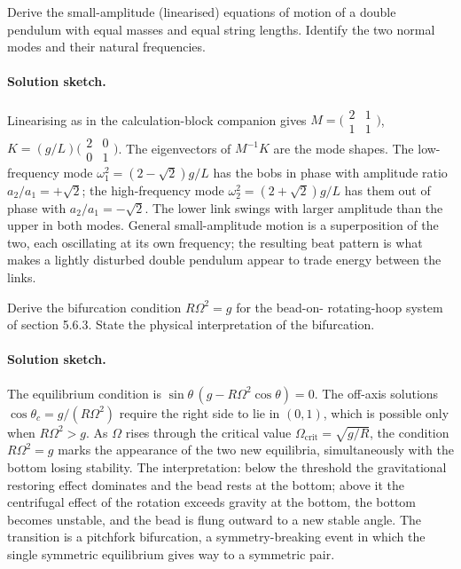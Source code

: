 \begin{exercise}
Derive the small-amplitude (linearised) equations of motion of a
double pendulum with equal masses and equal string lengths. Identify
the two normal modes and their natural frequencies.

\paragraph{Solution sketch.} Linearising as in the calculation-block
companion gives $M = \bigl(\begin{smallmatrix}2&1\\1&1\end{smallmatrix}
\bigr)$, $K = (g/L)\bigl(\begin{smallmatrix}2&0\\0&1\end{smallmatrix}
\bigr)$. The eigenvectors of $M^{-1}K$ are the mode shapes. The
low-frequency mode $\omega_1^2 = (2-\sqrt2)g/L$ has the bobs in phase
with amplitude ratio $a_2/a_1 = +\sqrt2$; the high-frequency mode
$\omega_2^2 = (2+\sqrt2)g/L$ has them out of phase with $a_2/a_1 =
-\sqrt2$. The lower link swings with larger amplitude than the upper in
both modes. General small-amplitude motion is a superposition of the
two, each oscillating at its own frequency; the resulting beat pattern
is what makes a lightly disturbed double pendulum appear to trade energy
between the links.
\end{exercise}

\begin{exercise}
Derive the bifurcation condition $R\Omega^2 = g$ for the bead-on-
rotating-hoop system of section 5.6.3. State the physical
interpretation of the bifurcation.

\paragraph{Solution sketch.} The equilibrium condition is
$\sin\theta\,(g - R\Omega^2\cos\theta) = 0$. The off-axis solutions
$\cos\theta_c = g/(R\Omega^2)$ require the right side to lie in
$(0,1)$, which is possible only when $R\Omega^2 > g$. As $\Omega$ rises
through the critical value $\Omega_\text{crit} = \sqrt{g/R}$, the
condition $R\Omega^2 = g$ marks the appearance of the two new
equilibria, simultaneously with the bottom losing stability. The
interpretation: below the threshold the gravitational restoring effect
dominates and the bead rests at the bottom; above it the centrifugal
effect of the rotation exceeds gravity at the bottom, the bottom becomes
unstable, and the bead is flung outward to a new stable angle. The
transition is a pitchfork bifurcation, a symmetry-breaking event in
which the single symmetric equilibrium gives way to a symmetric pair.
\end{exercise}

